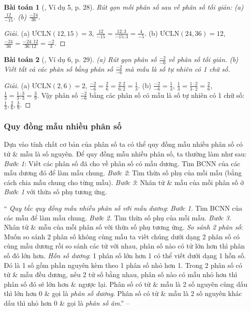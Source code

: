 \documentclass{article}
\newtheorem{baitoan}{Bài toán}
\begin{document}
\begin{baitoan}[\cite{SGK_Toan_6_Canh_Dieu_tap_2}, Ví dụ 5, p. 28]
	Rút gọn mỗi phân số sau về phân số tối giản: (a) $\frac{12}{-15}$. (b) $\frac{-24}{36}$.
\end{baitoan}

\begin{proof}[Giải]
	(a) $\mbox{ƯCLN}(12,15) = 3$, $\frac{12}{-15} = \frac{12:3}{-15:3} = \frac{4}{-5}$. (b) $\mbox{ƯCLN}(24,36) = 12$, $\frac{-24}{36} = \frac{-24:12}{36:12} = \frac{-2}{3}$.
\end{proof}

\begin{baitoan}[\cite{SGK_Toan_6_Canh_Dieu_tap_2}, Ví dụ 6, p. 29]
	(a) Rút gọn phân số $\frac{-2}{-6}$ về phân số tối giản. (b) Viết tất cả các phân số bằng phân số $\frac{-2}{-6}$ mà mẫu là số tự nhiên có 1 chữ số.
\end{baitoan}

\begin{proof}[Giải]
	(a) $\mbox{ƯCLN}(2,6) = 2$, $\frac{-2}{-6} = \frac{2}{6} = \frac{2:2}{6:2} = \frac{1}{3}$. (b) $\frac{-2}{-6} = \frac{1}{3}$, $\frac{1}{3} = \frac{1\cdot2}{3\cdot2} = \frac{2}{6}$, $\frac{1}{3} = \frac{1\cdot3}{3\cdot3} = \frac{3}{9}$. Vậy phân số $\frac{-2}{-6}$ bằng các phân số có mẫu là số tự nhiên có 1 chữ số: $\frac{1}{3},\frac{2}{6},\frac{3}{9}$.
\end{proof}

\subsubsection{Quy đồng mẫu nhiều phân số}
Dựa vào tính chất cơ bản của phân số ta có thể quy đồng mẫu nhiều phân số có tử \& mẫu là số nguyên. Để quy đồng mẫu nhiều phân số, ta thường làm như sau: \textit{Bước 1}: Viết các phân số đã cho về phân số có mẫu dương. Tìm BCNN của các mẫu dương đó để làm mẫu chung. \textit{Bước 2}: Tìm thừa số phụ của mỗi mẫu (bằng cách chia mẫu chung cho từng mẫu). \textit{Bước 3}: Nhân tử \& mẫu của mỗi phân số ở \textit{Bước 1} với thừa số phụ tương ứng.

\noindent`` \textit{Quy tắc quy đồng mẫu nhiều phân số với mẫu dương}: \textit{Bước 1.} Tìm BCNN của các mẫu để làm mẫu chung. \textit{Bước 2.} Tìm thừa số phụ của mỗi mẫu. \textit{Bước 3.} Nhân tử \& mẫu của mỗi phân số với thừa số phụ tương ứng.  \textit{So sánh 2 phân số}: Muốn so sánh 2 phân số không cùng mẫu ta viết chúng dưới dạng 2 phân số có cùng mẫu dương rồi so sánh các tử với nhau, phân số nào có tử lớn hơn thì phân số đó lớn hơn.  \textit{Hỗn số dương}: 1 phân số lớn hơn 1 có thể viết dưới dạng 1 hỗn số. Đó là 1 số gồm phần nguyên kèm theo 1 phân số nhỏ hơn 1.  Trong 2 phân số có tử \& mẫu đều dương, nếu 2 tử số bằng nhau, phân số nào có mẫu nhỏ hơn thì phân số đó sẽ lớn hơn \& ngược lại.  Phân số có tử \& mẫu là 2 số nguyên cùng dấu thì lớn hơn 0 \& gọi là \textit{phân số dương}. Phân số có tử \& mẫu là 2 số nguyên khác dấu thì nhỏ hơn 0 \& gọi là \textit{phân số âm}.'' -- \cite[Chap. III, \S2, p. 48]{Tuyen_Toan_6}
\end{document}
